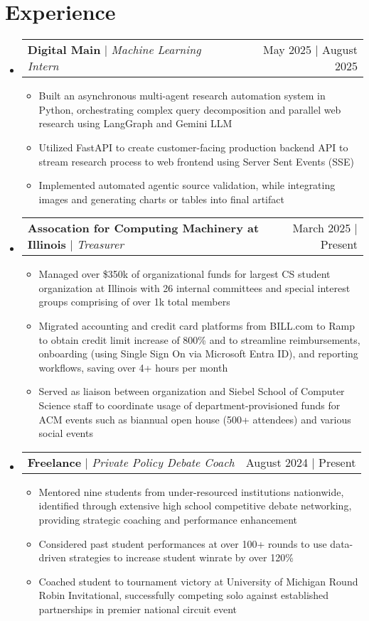 \documentclass{article}
\makeatletter
\newcommand{\resumeItem}[1]{
  \item\small{
    {#1 \vspace{-2pt}}
  }
}
\newcommand{\resumeProjectHeading}[2]{
    \item
    \begin{tabular*}{0.97\textwidth}{l@{\extracolsep{\fill}}r}
      \small#1 & #2 \\
    \end{tabular*}\vspace{-7pt}
}
\newcommand{\resumeSubHeadingListStart}{\begin{itemize}[leftmargin=0.15in, label={}]}
\newcommand{\resumeSubHeadingListEnd}{\end{itemize}}
\newcommand{\resumeItemListStart}{\begin{itemize}}
\newcommand{\resumeItemListEnd}{\end{itemize}\vspace{-5pt}}
\makeatother
\begin{document}
\section{Experience}
\resumeSubHeadingListStart
\resumeProjectHeading
{\textbf{Digital Main} $|$ {\footnotesize\emph{Machine Learning Intern}}}{May 2025 | August 2025}
\resumeItemListStart
\resumeItem{Built an asynchronous multi-agent research automation system in Python, orchestrating complex query decomposition and parallel web research using LangGraph and Gemini LLM}
\resumeItem{Utilized FastAPI to create customer-facing production backend API to stream research process to web frontend using Server Sent Events (SSE)}
\resumeItem{Implemented automated agentic source validation, while integrating images and generating charts or tables into final artifact}
\resumeItemListEnd
\resumeProjectHeading {\textbf{Assocation for Computing Machinery at Illinois} $|$ {\footnotesize\emph{Treasurer}}}{March 2025 | Present}
\resumeItemListStart
\resumeItem{Managed over \$350k of organizational funds for largest CS student organization at Illinois with 26 internal committees and special interest groups comprising of over 1k total members}
\resumeItem{Migrated accounting and credit card platforms from BILL.com to Ramp to obtain credit limit increase of 800\% and to streamline reimbursements, onboarding (using Single Sign On via Microsoft Entra ID), and reporting workflows, saving over 4+ hours per month} 
\resumeItem{Served as liaison between organization and Siebel School of Computer Science staff to coordinate usage of department-provisioned funds for ACM events such as biannual open house (500+ attendees) and various social events}
\resumeItemListEnd

\resumeProjectHeading
{\textbf{Freelance} $|$ {\footnotesize\emph{Private Policy Debate Coach}}}{August 2024 | Present}
\resumeItemListStart
\resumeItem{Mentored nine students from under-resourced institutions nationwide, identified through extensive high school competitive debate networking, providing strategic coaching and performance enhancement}
\resumeItem{Considered past student performances at over 100+ rounds to use data-driven strategies to increase student winrate by over 120\%}
\resumeItem{Coached student to tournament victory at University of Michigan Round Robin Invitational, successfully competing solo against established partnerships in premier national circuit event}
\resumeItemListEnd
\resumeSubHeadingListEnd

\vspace{-10pt}
\end{document}
